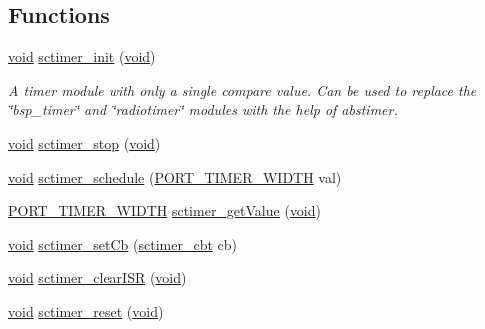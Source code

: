 \subsection*{Functions}
\begin{DoxyCompactItemize}
\item 
\hyperlink{usb__devapi_8h_afabf60e7f57651d6d595a02c75f07cd0}{void} \hyperlink{group__sctimer_ga69345c421ed09ef37ffb53cf392f9c65}{sctimer\+\_\+init} (\hyperlink{usb__devapi_8h_afabf60e7f57651d6d595a02c75f07cd0}{void})
\begin{DoxyCompactList}\small\item\em A timer module with only a single compare value. Can be used to replace the \char`\"{}bsp\+\_\+timer\char`\"{} and \char`\"{}radiotimer\char`\"{} modules with the help of abstimer. \end{DoxyCompactList}\item 
\hyperlink{usb__devapi_8h_afabf60e7f57651d6d595a02c75f07cd0}{void} \hyperlink{group__sctimer_ga93457ee3857a5a997f9aa856846191ef}{sctimer\+\_\+stop} (\hyperlink{usb__devapi_8h_afabf60e7f57651d6d595a02c75f07cd0}{void})
\item 
\hyperlink{usb__devapi_8h_afabf60e7f57651d6d595a02c75f07cd0}{void} \hyperlink{group__sctimer_ga75c5abd9a9fd75879e4add013048fb69}{sctimer\+\_\+schedule} (\hyperlink{z1_2board__info_8h_abe66b9c1c60db84f2a99f2b827275f24}{P\+O\+R\+T\+\_\+\+T\+I\+M\+E\+R\+\_\+\+W\+I\+D\+TH} val)
\item 
\hyperlink{z1_2board__info_8h_abe66b9c1c60db84f2a99f2b827275f24}{P\+O\+R\+T\+\_\+\+T\+I\+M\+E\+R\+\_\+\+W\+I\+D\+TH} \hyperlink{group__sctimer_ga5d432097f53b624c10030ce92d8dc0f8}{sctimer\+\_\+get\+Value} (\hyperlink{usb__devapi_8h_afabf60e7f57651d6d595a02c75f07cd0}{void})
\item 
\hyperlink{usb__devapi_8h_afabf60e7f57651d6d595a02c75f07cd0}{void} \hyperlink{group__sctimer_gac5a05074749b0e138c23e0342bad5690}{sctimer\+\_\+set\+Cb} (\hyperlink{group__sctimer_ga0a0d5fd87809e69b643e507977c2f8e4}{sctimer\+\_\+cbt} cb)
\item 
\hyperlink{usb__devapi_8h_afabf60e7f57651d6d595a02c75f07cd0}{void} \hyperlink{group__sctimer_ga778aeade98c97698e7f082fb10feef20}{sctimer\+\_\+clear\+I\+SR} (\hyperlink{usb__devapi_8h_afabf60e7f57651d6d595a02c75f07cd0}{void})
\item 
\hyperlink{usb__devapi_8h_afabf60e7f57651d6d595a02c75f07cd0}{void} \hyperlink{group__sctimer_ga0abde5f7bfc9a70d93c7e4bce5778643}{sctimer\+\_\+reset} (\hyperlink{usb__devapi_8h_afabf60e7f57651d6d595a02c75f07cd0}{void})
\end{DoxyCompactItemize}


